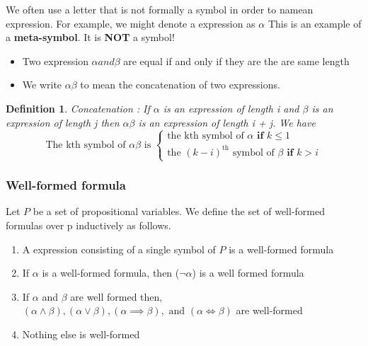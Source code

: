 \documentclass{article}
\newtheorem{definition}[theorem]{Definition}
\newenvironment{cblock}[1]{%
    \tcolorbox[beamer,%
    noparskip,breakable,
    colback=lightblue,colframe=darkblue,%
    colbacklower=darkblue!75!lightblue,%
    title=#1]}%
    {\endtcolorbox}
\begin{document}
\begin{cblock}{Meta-Symbols}
We often use a letter that is not formally a symbol in order to namean expression. For example, we might denote a expression as \(\alpha\)
This is an example of a \textbf{meta-symbol}. It is \textbf{NOT} a symbol!
\end{cblock}

\begin{itemize}
\item Two expression \(\alpha and \beta\) are equal if and only if they are the are same length 
\item We write \(\alpha \beta\) to mean the concatenation of two expressions.
\end{itemize}

\begin{definition}Concatenation : 
If \(\alpha\) is an expression of length i and \(\beta\) is an expression of length j then \(\alpha \beta\) is an expression of length i + j. We have\\

\[ \text{The kth symbol of } \alpha \beta \text{ is } \begin{cases} \text{the kth symbol of } \alpha \textbf{     if  } k \leq 1 \\
\text{the } (k-i)^{\text{th}} \text{ symbol of } \beta \textbf{     if  } k > i 
\end{cases}\] 
\end{definition}

\subsubsection{Well-formed formula}
Let \(P\) be a set of propositional variables. We define the set of well-formed formulas over p inductively as follows. 

\begin{enumerate}
\item A expression consisting of a single symbol of \(P\) is  a well-formed formula 
\item If \(\alpha\) is a well-formed formula, then (\(\neg \alpha\)) is a well formed formula
\item If \(\alpha\) and \(\beta\) are well formed then, \((\alpha \wedge \beta), (\alpha \vee \beta), (\alpha \implies \beta), \text{ and } (\alpha \iff \beta) \) are well-formed
\item Nothing else is well-formed
\end{enumerate}
\end{document}
